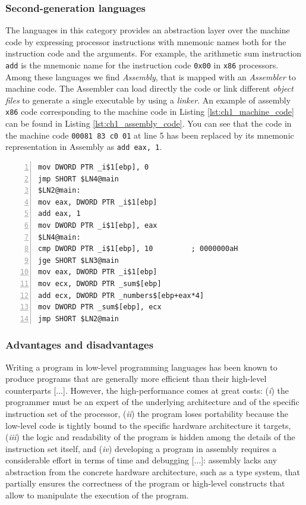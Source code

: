 \subsubsection*{Second-generation languages}
The languages in this category provides an abstraction layer over the machine code by expressing processor instructions with mnemonic names both for the instruction code and the arguments. For example, the arithmetic sum instruction \texttt{add} is the mnemonic name for the instruction code \texttt{0x00} in \texttt{x86} processors. Among these languages we find \textit{Assembly}, that is mapped with an \textit{Assembler} to machine code. The Assembler can load directly the code or link different \textit{object files} to generate a single executable by using a \textit{linker}. An example of assembly \texttt{x86} code corresponding to the machine code in Listing \ref{lst:ch1_machine_code} can be found in Listing \ref{lst:ch1_assembly_code}. You can see that the code in the machine code \texttt{00081	83 c0 01} at line 5 has been replaced by its mnemonic representation in Assembly as \texttt{add	eax, 1}.

\begin{minipage}{\linewidth}
\begin{lstlisting}[numbers = left, caption = Assembly x86 code to compute the sum of a sequence of numbers, label = lst:ch1_assembly_code]
mov	DWORD PTR _i$1[ebp], 0
jmp	SHORT $LN4@main
$LN2@main:
mov	eax, DWORD PTR _i$1[ebp]
add	eax, 1
mov	DWORD PTR _i$1[ebp], eax
$LN4@main:
cmp	DWORD PTR _i$1[ebp], 10			; 0000000aH
jge	SHORT $LN3@main
mov	eax, DWORD PTR _i$1[ebp]
mov	ecx, DWORD PTR _sum$[ebp]
add	ecx, DWORD PTR _numbers$[ebp+eax*4]
mov	DWORD PTR _sum$[ebp], ecx
jmp	SHORT $LN2@main
\end{lstlisting}
\end{minipage}

\subsubsection*{Advantages and disadvantages}
Writing a program in low-level programming languages has been known to produce programs that are generally more efficient than their high-level counterparts [...]. However, the high-performance comes at great costs: (\textit{i}) the programmer must be an expert of the underlying architecture and of the specific instruction set of the processor, (\textit{ii}) the program loses portability because the low-level code is tightly bound to the specific hardware architecture it targets, (\textit{iii}) the logic and readability of the program is hidden among the details of the instruction set itself, and (\textit{iv}) developing a program in assembly requires a considerable effort in terms of time and debugging [...]: assembly lacks any abstraction from the concrete hardware architecture, such as a type system, that partially ensures the correctness of the program or high-level constructs that allow to manipulate the execution of the program.

